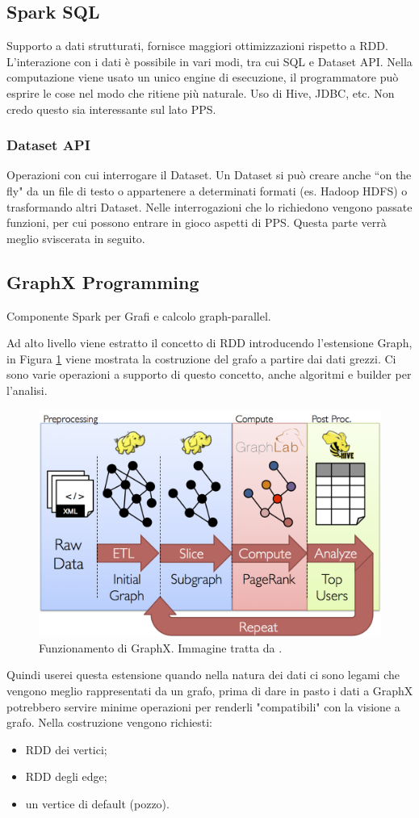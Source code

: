\documentclass[12pt,italian]{article}
\begin{document}
\subsection{Spark SQL}
Supporto a dati strutturati, fornisce maggiori ottimizzazioni rispetto a RDD. L'interazione con i dati è possibile in vari modi, tra cui SQL e Dataset API.
Nella computazione viene usato un unico engine di esecuzione, il programmatore può esprire le cose nel modo che ritiene più naturale. Uso di Hive, JDBC, etc. 
Non credo questo sia interessante sul lato PPS. %
\subsubsection{Dataset API}
Operazioni con cui interrogare il Dataset. 
Un Dataset si può creare anche ``on the fly" da un file di testo o appartenere a determinati formati (es. Hadoop HDFS) o trasformando altri Dataset.
Nelle interrogazioni che lo richiedono vengono passate funzioni, per cui possono entrare in gioco aspetti di PPS. Questa parte verrà meglio sviscerata in seguito. %
\subsection{GraphX Programming}
Componente Spark per Grafi e calcolo graph-parallel.

Ad alto livello viene estratto il concetto di RDD introducendo l'estensione Graph, in Figura \ref{fig:GraphX} viene mostrata la costruzione del grafo a partire dai dati grezzi.
Ci sono varie operazioni a supporto di questo concetto, anche algoritmi e builder per l'analisi.
\begin{figure}[H]
	\centering 
	\includegraphics[width=0.8\linewidth]{img/graph_analytics_pipeline.png}
	\caption{Funzionamento di GraphX. Immagine tratta da \cite{spark}.}
	\label{fig:GraphX}
\end{figure}
Quindi userei questa estensione quando nella natura dei dati ci sono legami che vengono meglio rappresentati da un grafo,
prima di dare in pasto i dati a GraphX potrebbero servire minime operazioni per renderli "compatibili" con la visione a grafo.
Nella costruzione vengono richiesti:
\begin{itemize}
	\item RDD dei vertici;
	\item RDD degli edge;
	\item un vertice di default (pozzo).
\end{itemize}
\end{document}
